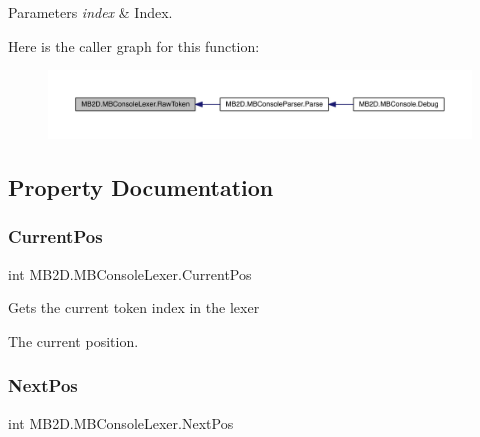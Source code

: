 \begin{DoxyParams}{Parameters}
{\em index} & Index.\\
\hline
\end{DoxyParams}
Here is the caller graph for this function\+:\nopagebreak
\begin{figure}[H]
\begin{center}
\leavevmode
\includegraphics[width=350pt]{class_m_b2_d_1_1_m_b_console_lexer_a9f08e0a2739eb027f6b8c46abe67f647_icgraph}
\end{center}
\end{figure}


\subsection{Property Documentation}
\hypertarget{class_m_b2_d_1_1_m_b_console_lexer_a15d3752a0f36b998985befdabfdb475e}{}\label{class_m_b2_d_1_1_m_b_console_lexer_a15d3752a0f36b998985befdabfdb475e} 
\subsubsection{\texorpdfstring{Current\+Pos}{CurrentPos}}
{\footnotesize\ttfamily int M\+B2\+D.\+M\+B\+Console\+Lexer.\+Current\+Pos\hspace{0.3cm}{\ttfamily [get]}}



Gets the current token index in the lexer 

The current position.\hypertarget{class_m_b2_d_1_1_m_b_console_lexer_aa3535c7e87e9d7855e3fb7848bf46ba8}{}\label{class_m_b2_d_1_1_m_b_console_lexer_aa3535c7e87e9d7855e3fb7848bf46ba8} 
\subsubsection{\texorpdfstring{Next\+Pos}{NextPos}}
{\footnotesize\ttfamily int M\+B2\+D.\+M\+B\+Console\+Lexer.\+Next\+Pos\hspace{0.3cm}{\ttfamily [get]}}



